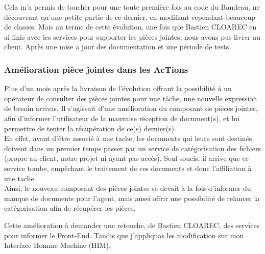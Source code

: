 \documentclass{rapport}
\begin{document}

Cela m'a permis de toucher pour une toute première fois au code du Bandeau, ne découvrant qu'une petite partie de ce dernier, en modifiant cependant beaucoup de classes. Mais au terme de cette évolution, une fois que Bastien CLOAREC en ai finis avec les services pour supporter les pièces jointes, nous avons pus livrer au client. Après une mise a jour des documentation et une période de tests.\\



\subsubsection{Amélioration pièce jointes dans les AcTions}

Plus d'un mois après la livraison de l'évolution offrant la possibilité à un opérateur de consulter des pièces jointes pour une tâche, une nouvelle expression de besoin arrivas. Il s'agissait d'une amélioration du composant de pièces jointes, afin d'informer l'utilisateur de la mauvaise réception de document(s), et lui permettre de tenter la récupération de ce(s) dernier(s).\\

En effet, avant d'être associé à une tache, les documents qui leurs sont destinés, doivent dans un premier temps passer par un service de catégorisation des fichiers (propre au client, notre projet ni ayant pas accès). Seul soucis, il arrive que ce service tombe, empêchant le traitement de ces documents et donc l'affiliation à une tache.\\

Ainsi, le nouveau composant des pièces jointes se devait à la fois d'informer du manque de documents pour l'agent, mais aussi offrir une possibilité de relancer la catégorisation afin de récupérer les pièces.\\


Cette amélioration à demander une retouche, de Bastien CLOAREC, des services pour informer le Front-End. Tandis que j'appliquas les modification sur mon Interface Homme Machine (IHM).\\
\end{document}
